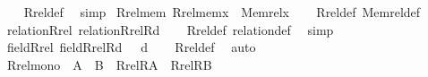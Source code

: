 \begin{isabellebody}
%
\isadelimproof
\ \ %
\endisadelimproof
%
\isatagproof
{}\isamarkupfalse%
\ Rrel{\isacharunderscore}{\kern0pt}def\ \isamarkupfalse%
\ simp%
\endisatagproof
{\isafoldproof}%
%
\isadelimproof
\isanewline
%
\endisadelimproof
\isanewline
{}\isamarkupfalse%
\ Rrel{\isacharunderscore}{\kern0pt}mem{\isacharcolon}{\kern0pt}\ {\isachardoublequoteopen}Rrel{\isacharparenleft}{\kern0pt}mem{\isacharcomma}{\kern0pt}x{\isacharparenright}{\kern0pt}\ {\isacharequal}{\kern0pt}\ Memrel{\isacharparenleft}{\kern0pt}x{\isacharparenright}{\kern0pt}{\isachardoublequoteclose}\isanewline
%
\isadelimproof
\ \ %
\endisadelimproof
%
\isatagproof
{}\isamarkupfalse%
\ Rrel{\isacharunderscore}{\kern0pt}def\ Memrel{\isacharunderscore}{\kern0pt}def\ \isacommand{{\isachardot}{\kern0pt}{\isachardot}{\kern0pt}}\isamarkupfalse%
%
\endisatagproof
{\isafoldproof}%
%
\isadelimproof
\isanewline
%
\endisadelimproof
\isanewline
{}\isamarkupfalse%
\ relation{\isacharunderscore}{\kern0pt}Rrel{\isacharcolon}{\kern0pt}\ {\isachardoublequoteopen}relation{\isacharparenleft}{\kern0pt}Rrel{\isacharparenleft}{\kern0pt}R{\isacharcomma}{\kern0pt}d{\isacharparenright}{\kern0pt}{\isacharparenright}{\kern0pt}{\isachardoublequoteclose}\isanewline
%
\isadelimproof
\ \ %
\endisadelimproof
%
\isatagproof
{}\isamarkupfalse%
\ Rrel{\isacharunderscore}{\kern0pt}def\ relation{\isacharunderscore}{\kern0pt}def\ \isamarkupfalse%
\ simp%
\endisatagproof
{\isafoldproof}%
%
\isadelimproof
\isanewline
%
\endisadelimproof
\isanewline
{}\isamarkupfalse%
\ field{\isacharunderscore}{\kern0pt}Rrel{\isacharcolon}{\kern0pt}\ {\isachardoublequoteopen}field{\isacharparenleft}{\kern0pt}Rrel{\isacharparenleft}{\kern0pt}R{\isacharcomma}{\kern0pt}d{\isacharparenright}{\kern0pt}{\isacharparenright}{\kern0pt}\ {\isasymsubseteq}\ \ d{\isachardoublequoteclose}\isanewline
%
\isadelimproof
\ \ %
\endisadelimproof
%
\isatagproof
{}\isamarkupfalse%
\ Rrel{\isacharunderscore}{\kern0pt}def\ \isamarkupfalse%
\ auto%
\endisatagproof
{\isafoldproof}%
%
\isadelimproof
\isanewline
%
\endisadelimproof
\isanewline
{}\isamarkupfalse%
\ Rrel{\isacharunderscore}{\kern0pt}mono\ {\isacharcolon}{\kern0pt}\ {\isachardoublequoteopen}A\ {\isasymsubseteq}\ B\ {\isasymLongrightarrow}\ Rrel{\isacharparenleft}{\kern0pt}R{\isacharcomma}{\kern0pt}A{\isacharparenright}{\kern0pt}\ {\isasymsubseteq}\ Rrel{\isacharparenleft}{\kern0pt}R{\isacharcomma}{\kern0pt}B{\isacharparenright}{\kern0pt}{\isachardoublequoteclose}\isanewline

\end{isabellebody}
